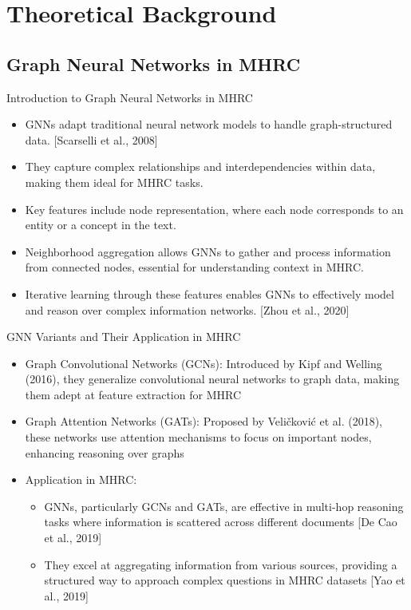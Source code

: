 \documentclass[10pt]{beamer}
\newcommand{\themename}{\textbf{\textsc{metropolis}}\xspace}
\begin{document}
  

\section{Theoretical Background}

\subsection{Graph Neural Networks in MHRC}

\begin{frame}{Introduction to Graph Neural Networks in MHRC}
  \begin{itemize}
    \item GNNs adapt traditional neural network models to handle graph-structured data. [Scarselli et al., 2008] \cite{RN203}
    \item They capture complex relationships and interdependencies within data, making them ideal for MHRC tasks.
    \item Key features include node representation, where each node corresponds to an entity or a concept in the text.
    \item Neighborhood aggregation allows GNNs to gather and process information from connected nodes, essential for understanding context in MHRC.
    \item Iterative learning through these features enables GNNs to effectively model and reason over complex information networks. [Zhou et al., 2020] \cite{RN1}
  \end{itemize}
\end{frame}


\begin{frame}{GNN Variants and Their Application in MHRC}
  \begin{itemize}
    \item Graph Convolutional Networks (GCNs): Introduced by Kipf and Welling (2016), they generalize convolutional neural networks to graph data, making them adept at feature extraction for MHRC \cite{RN209}
    \item Graph Attention Networks (GATs): Proposed by Veličković et al. (2018), these networks use attention mechanisms to focus on important nodes, enhancing reasoning over graphs \cite{RN7}
    \item Application in MHRC: 
      \begin{itemize}
        \item GNNs, particularly GCNs and GATs, are effective in multi-hop reasoning tasks where information is scattered across different documents [De Cao et al., 2019] \cite{RN117}
        \item They excel at aggregating information from various sources, providing a structured way to approach complex questions in MHRC datasets [Yao et al., 2019]
      \end{itemize}
  \end{itemize}
\end{frame}
\end{document}
